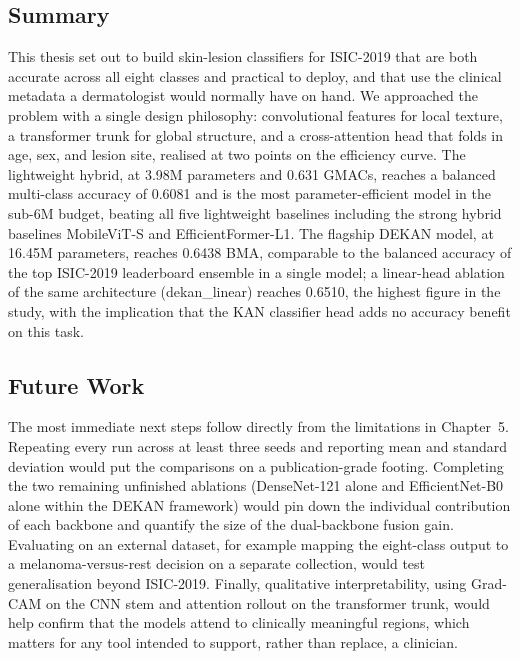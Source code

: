 \subsection{Summary}

This thesis set out to build skin-lesion classifiers for ISIC-2019 that are both
accurate across all eight classes and practical to deploy, and that use the
clinical metadata a dermatologist would normally have on hand. We approached the
problem with a single design philosophy: convolutional features for local
texture, a transformer trunk for global structure, and a cross-attention head
that folds in age, sex, and lesion site, realised at two points on the
efficiency curve. The lightweight hybrid, at 3.98M parameters and 0.631 GMACs,
reaches a balanced multi-class accuracy of 0.6081 and is the most
parameter-efficient model in the sub-6M budget, beating all five lightweight
baselines including the strong hybrid baselines MobileViT-S and
EfficientFormer-L1. The flagship DEKAN model, at 16.45M parameters, reaches 0.6438 BMA, comparable
to the balanced accuracy of the top ISIC-2019 leaderboard ensemble in a single
model; a linear-head ablation of the same architecture (dekan\_linear) reaches
0.6510, the highest figure in the study, with the implication that the KAN
classifier head adds no accuracy benefit on this task.

\subsection{Future Work}

The most immediate next steps follow directly from the limitations in
Chapter~5. Repeating every run across at least three seeds and reporting mean and
standard deviation would put the comparisons on a publication-grade footing.
Completing the two remaining unfinished ablations (DenseNet-121 alone and
EfficientNet-B0 alone within the DEKAN framework) would pin down the
individual contribution of each backbone and quantify the size of the
dual-backbone fusion gain. Evaluating on an external dataset, for example mapping
the eight-class output to a melanoma-versus-rest decision on a separate
collection, would test generalisation beyond ISIC-2019. Finally, qualitative
interpretability, using Grad-CAM on the CNN stem and attention rollout on the
transformer trunk, would help confirm that the models attend to clinically
meaningful regions, which matters for any tool intended to support, rather than
replace, a clinician.
